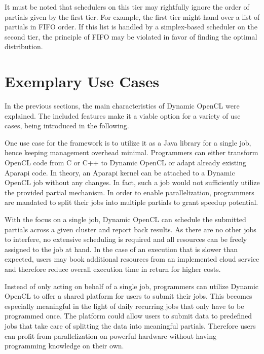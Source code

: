It must be noted that schedulers on this tier may rightfully ignore the order of partials given by the first tier. For example, the first tier might hand over a list of partials in FIFO order. If this list is handled by a simplex-based scheduler on the second tier, the principle of FIFO may be violated in favor of finding the optimal distribution.

\section{Exemplary Use Cases}
\label{use_cases}
In the previous sections, the main characteristics of Dynamic OpenCL were explained. The included features make it a viable option for a variety of use cases, being introduced in the following.

\begin{description}[style=nextline]
	\item[Job Based Library]
	One use case for the framework is to utilize it as a Java library for a single job, hence keeping management overhead minimal. Programmers can either transform OpenCL code from C or C++ to Dynamic OpenCL or adapt already existing Aparapi code. In theory, an Aparapi kernel can be attached to a Dynamic OpenCL job without any changes. In fact, such a job would not sufficiently utilize the provided partial mechanism. In order to enable parallelization, programmers are mandated to split their jobs into multiple partials to grant speedup potential.

	With the focus on a single job, Dynamic OpenCL can schedule the submitted partials across a given cluster and report back results. As there are no other jobs to interfere, no extensive scheduling is required and all resources can be freely assigned to the job at hand. In the case of an execution that is slower than expected, users may book additional resources from an implemented cloud service and therefore reduce overall execution time in return for higher costs.

	\item[Local Cluster Provider]

	Instead of only acting on behalf of a single job, programmers can utilize Dynamic OpenCL to offer a shared platform for users to submit their jobs. This becomes especially meaningful in the light of daily recurring jobs that only have to be programmed once. The platform could allow users to submit data to predefined jobs that take care of splitting the data into meaningful partials. Therefore users can profit from parallelization on powerful hardware without having programming knowledge on their own.


\end{description}
